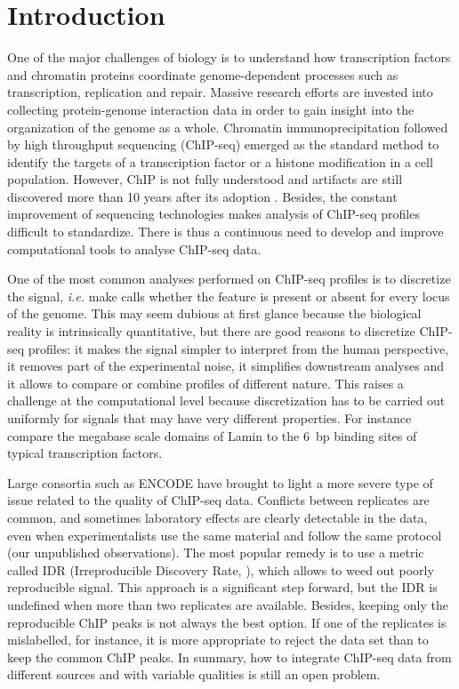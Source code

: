 \documentclass{bioinfo}
\begin{document}
\section{Introduction}
One of the major challenges of biology is to understand how transcription
factors and chromatin proteins coordinate genome-dependent processes
such as transcription, replication and repair. Massive research efforts
are invested into collecting protein-genome interaction data in order
to gain insight into the organization of the genome as a whole. Chromatin
immunoprecipitation followed by high throughput sequencing (ChIP-seq)
emerged as the standard method to identify the targets of a transcription
factor or a histone modification in a cell population. However, ChIP is not
fully understood and artifacts are still discovered more than 10 years after
its adoption \citep{pmid24349523, pmid24173036}. Besides, the constant
improvement of sequencing technologies makes analysis of ChIP-seq profiles
difficult to standardize. There is thus a continuous need to develop and
improve computational tools to analyse ChIP-seq data.

One of the most common analyses performed on ChIP-seq profiles is to
discretize the signal, \textit{i.e.} make calls whether the feature is
present or absent for every locus of the genome. This may seem
dubious at first glance because the biological reality is intrinsically
quantitative, but there are good reasons to discretize ChIP-seq
profiles: it makes the signal simpler to interpret from the human
perspective, it removes part of the experimental noise,
it simplifies downstream analyses and it allows to compare or
combine profiles of different nature. This raises a challenge at the
computational level because discretization has to be carried out uniformly
for signals that may have very different properties. For instance compare
the megabase scale domains of Lamin \citep{pmid18463634} to the 6~bp
binding sites of typical transcription factors.

Large consortia such as ENCODE \citep{encode} have brought to light
a more severe type of issue related to the quality of ChIP-seq data.
Conflicts between replicates are common, and
sometimes laboratory effects are clearly detectable in the data,
even when experimentalists use the same material and follow the same
protocol (our unpublished observations). The most popular remedy is to
use a metric called IDR (Irreproducible Discovery Rate, \citealp{li2011}),
which allows to weed
out poorly reproducible signal. This approach is a significant step
forward, but the IDR is undefined when more than two replicates are
available. Besides, keeping only the reproducible ChIP peaks is not
always the best option. If one of the replicates is mislabelled,
for instance, it is more appropriate to reject the data set than to keep
the common ChIP peaks. In summary, how to integrate ChIP-seq data
from different sources and with variable qualities is still an open
problem.
\end{document}
